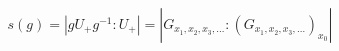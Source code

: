 \documentclass[preview]{standalone}
\begin{document}
\begin{align*}
s(g) = \left|gU_+g^{-1} : U_+\right| =  \left|G_{x_1, x_2, x_3, \dots} : \left(G_{x_1, x_2, x_3, \dots}\right)_{x_0} \right|
\end{align*}
\end{document}
